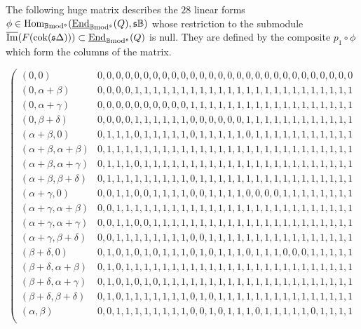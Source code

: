 \documentclass[12pt]{article}
\def\Hom{{\rm Hom}}
\def\Endi{{\underline{\rm End}}}
\def\scoker{{\rm cok}}
\def\B{{\mathbb B}}
\def\imm{\overline{\rm Im}}
\def\Hom {{\mbox{Hom}}}
\def\yb{\mathfrak{s}}
\def\b2{{\rm \B mod^{\mathfrak s}}}
\begin{document}
The following huge matrix describes the $28$ linear forms $\phi\in \Hom_\b2(\Endi_\b2(Q),\yb\B)$ whose restriction to the submodule $\imm(F(\scoker(\yb\Delta)))\subset \Endi_\b2(Q)$ is null. They are defined by the composite $p_1\circ \phi$ which form the columns of the matrix.  \vspace{0.15in}
 \begin{small}
 $$
\left(
\begin{array}{cc}
 (0,0) & 0,0,0,0,0,0,0,0,0,0,0,0,0,0,0,0,0,0,0,0,0,0,0,0,0,0,0,0 \\
 (0,\alpha +\beta ) & 0,0,0,0,1,1,1,1,1,1,1,1,1,1,1,1,1,1,1,1,1,1,1,1,1,1,1,1 \\
 (0,\alpha +\gamma ) & 0,0,0,0,0,0,0,0,0,0,1,1,1,1,1,1,1,1,1,1,1,1,1,1,1,1,1,1 \\
(0,\beta +\delta ) & 0,0,0,0,1,1,1,1,1,1,0,0,0,0,0,0,1,1,1,1,1,1,1,1,1,1,1,1 \\
 (\alpha +\beta ,0) & 0,1,1,1,0,1,1,1,1,1,0,1,1,1,1,1,0,1,1,1,1,1,1,1,1,1,1,1 \\
 (\alpha +\beta ,\alpha +\beta ) & 0,1,1,1,1,1,1,1,1,1,1,1,1,1,1,1,1,1,1,1,1,1,1,1,1,1,1,1 \\
 (\alpha +\beta ,\alpha +\gamma ) & 0,1,1,1,0,1,1,1,1,1,1,1,1,1,1,1,1,1,1,1,1,1,1,1,1,1,1,1 \\
 (\alpha +\beta ,\beta +\delta ) & 0,1,1,1,1,1,1,1,1,1,0,1,1,1,1,1,1,1,1,1,1,1,1,1,1,1,1,1 \\
 (\alpha +\gamma ,0) & 0,0,1,1,0,0,1,1,1,1,0,0,1,1,1,1,0,0,0,0,1,1,1,1,1,1,1,1 \\
 (\alpha +\gamma ,\alpha +\beta ) & 0,0,1,1,1,1,1,1,1,1,1,1,1,1,1,1,1,1,1,1,1,1,1,1,1,1,1,1 \\
 (\alpha +\gamma ,\alpha +\gamma ) & 0,0,1,1,0,0,1,1,1,1,1,1,1,1,1,1,1,1,1,1,1,1,1,1,1,1,1,1 \\
 (\alpha +\gamma ,\beta +\delta ) & 0,0,1,1,1,1,1,1,1,1,0,0,1,1,1,1,1,1,1,1,1,1,1,1,1,1,1,1 \\
 (\beta +\delta ,0) & 0,1,0,1,0,1,0,1,1,1,0,1,0,1,1,1,0,1,1,1,0,0,0,1,1,1,1,1 \\
 (\beta +\delta ,\alpha +\beta ) & 0,1,0,1,1,1,1,1,1,1,1,1,1,1,1,1,1,1,1,1,1,1,1,1,1,1,1,1 \\
 (\beta +\delta ,\alpha +\gamma ) & 0,1,0,1,0,1,0,1,1,1,1,1,1,1,1,1,1,1,1,1,1,1,1,1,1,1,1,1 \\
 (\beta +\delta ,\beta +\delta ) & 0,1,0,1,1,1,1,1,1,1,0,1,0,1,1,1,1,1,1,1,1,1,1,1,1,1,1,1 \\
 (\alpha ,\beta ) & 0,0,1,1,1,1,1,1,1,1,0,0,1,0,1,1,1,0,1,1,1,1,1,0,1,1,1,1 \\

\end{array}$$
\end{small}
\end{document}
